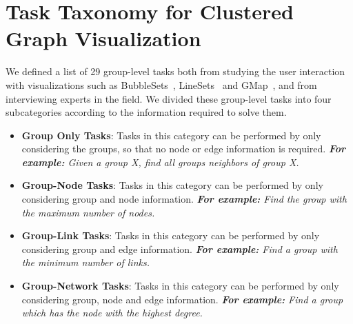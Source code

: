 \documentclass{article}
\newcommand{\Bold}[1]{\textbf{#1}}
\newcommand{\Example}[1]{\textit{\footnotesize #1}}
\begin{document}
\section{Task Taxonomy for Clustered Graph Visualization}
We defined a list of 29 group-level tasks both from studying the user interaction with visualizations such as BubbleSets~\cite{IV_Collins}, LineSets~\cite{IV_Alper} and GMap~\cite{IV_Gansner}, and from interviewing experts in the field. We divided these group-level tasks into four subcategories according to the information required to solve them. 

\begin{itemize}
\item \Bold{Group Only Tasks}:  Tasks in this category can be performed by only considering the groups, so that no node or edge information is required. \Example{\Bold{For example:} Given a group X, find all groups neighbors of group X.}
\item \Bold{Group-Node Tasks}: Tasks in this category can be performed by only considering group and node information. \Example{\Bold{For example:} Find the group with the maximum number of nodes.}
\item \Bold{Group-Link Tasks}: Tasks in this category can be performed by only considering group and edge information. \Example{\Bold{For example:} Find a group with the minimum number of links.}
\item \Bold{Group-Network Tasks}: Tasks in this category can be performed by only considering group, node and edge information. \Example{\Bold{For example:} Find a group which has the node with the highest degree.}
\end{itemize}
\end{document}
